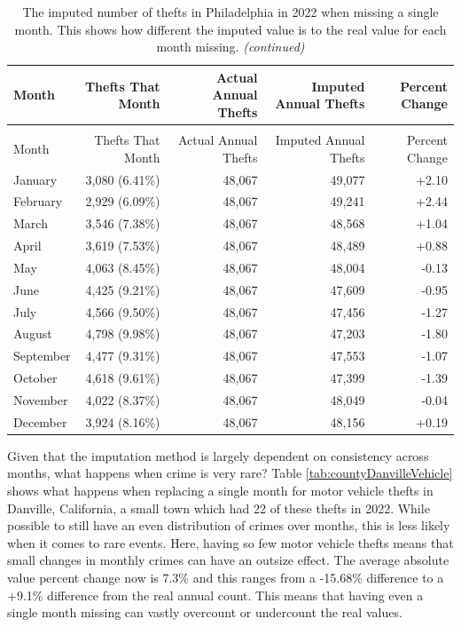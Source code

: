 \documentclass[
]{krantz}
\begin{document}
\begin{longtable}[t]{l|r|r|r|r}
\caption{\label{tab:countyPhillyThefts}The imputed number of thefts in Philadelphia in 2022 when missing a single month. This shows how different the imputed value is to the real value for each month missing.}\\
\hline
Month & Thefts That Month & Actual Annual Thefts & Imputed Annual Thefts & Percent Change\\
\hline
\endfirsthead
\caption[]{\label{tab:countyPhillyThefts}The imputed number of thefts in Philadelphia in 2022 when missing a single month. This shows how different the imputed value is to the real value for each month missing. \textit{(continued)}}\\
\hline
Month & Thefts That Month & Actual Annual Thefts & Imputed Annual Thefts & Percent Change\\
\hline
\endhead
January & 3,080 (6.41\%) & 48,067 & 49,077 & +2.10\\
\hline
February & 2,929 (6.09\%) & 48,067 & 49,241 & +2.44\\
\hline
March & 3,546 (7.38\%) & 48,067 & 48,568 & +1.04\\
\hline
April & 3,619 (7.53\%) & 48,067 & 48,489 & +0.88\\
\hline
May & 4,063 (8.45\%) & 48,067 & 48,004 & -0.13\\
\hline
June & 4,425 (9.21\%) & 48,067 & 47,609 & -0.95\\
\hline
July & 4,566 (9.50\%) & 48,067 & 47,456 & -1.27\\
\hline
August & 4,798 (9.98\%) & 48,067 & 47,203 & -1.80\\
\hline
September & 4,477 (9.31\%) & 48,067 & 47,553 & -1.07\\
\hline
October & 4,618 (9.61\%) & 48,067 & 47,399 & -1.39\\
\hline
November & 4,022 (8.37\%) & 48,067 & 48,049 & -0.04\\
\hline
December & 3,924 (8.16\%) & 48,067 & 48,156 & +0.19\\
\hline
\end{longtable}

Given that the imputation method is largely dependent on
consistency across months, what happens when crime is very
rare? Table \ref{tab:countyDanvilleVehicle} shows what
happens when replacing a single month for motor vehicle
thefts in Danville, California, a small town which had 22 of
these thefts in 2022. While possible to still have an even
distribution of crimes over months, this is less likely when
it comes to rare events. Here, having so few motor vehicle
thefts means that small changes in monthly crimes can have
an outsize effect. The average absolute value percent change
now is 7.3\% and this ranges from a -15.68\% difference to a
+9.1\% difference from the real annual count. This means
that having even a single month missing can vastly overcount
or undercount the real values.
\end{document}
